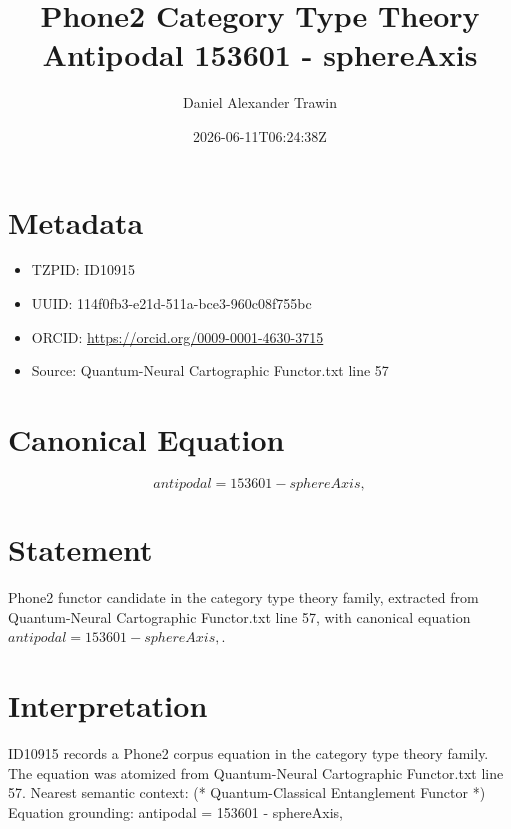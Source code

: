 \documentclass[11pt]{article}
\title{Phone2 Category Type Theory Antipodal 153601 - sphereAxis}
\author{Daniel Alexander Trawin}
\date{2026-06-11T06:24:38Z}
\begin{document}
\maketitle
\section*{Metadata}
\begin{itemize}
\item TZPID: ID10915
\item UUID: 114f0fb3-e21d-511a-bce3-960c08f755bc
\item ORCID: \url{https://orcid.org/0009-0001-4630-3715}
\item Source: Quantum-Neural Cartographic Functor.txt line 57
\end{itemize}
\section*{Canonical Equation}
\[
antipodal = 153601 - sphereAxis,
\]
\section*{Statement}
Phone2 functor candidate in the category type theory family, extracted from Quantum-Neural Cartographic Functor.txt line 57, with canonical equation $antipodal = 153601 - sphereAxis,$.
\section*{Interpretation}
ID10915 records a Phone2 corpus equation in the category type theory family. The equation was atomized from Quantum-Neural Cartographic Functor.txt line 57. Nearest semantic context: (* Quantum-Classical Entanglement Functor *) Equation grounding: antipodal = 153601 - sphereAxis,
\end{document}
